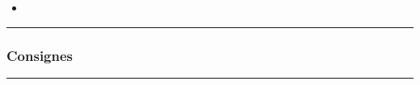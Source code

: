 \documentclass[a4paper,10pt]{article}
\begin{document}
\begin{itemize}
    \item \textbf{\color{lime}\color{white}}
\end{itemize}



\color{blue}\par\noindent\rule{\textwidth}{0.4pt}\color{white}

\color{blue}
\subsubsection{Consignes}\color{white}




\color{green}\par\noindent\rule{\textwidth}{0.4pt}\color{white}
\end{document}
